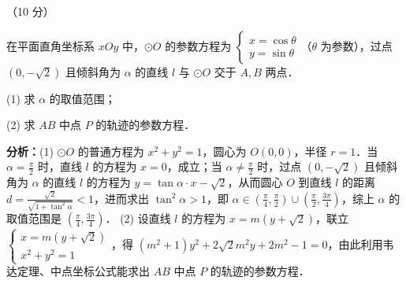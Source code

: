 \begin{question}[points=10]
[选修 4-4：坐标系与参数方程]（10 分）

在平面直角坐标系 $xOy$ 中，$\odot O$ 的参数方程为 $\begin{cases} x=\cos\theta \\ y=\sin\theta \end{cases}$（$\theta$ 为参数），过点 $(0,-\sqrt{2})$ 且倾斜角为 $\alpha$ 的直线 $l$ 与 $\odot O$ 交于 $A,B$ 两点．

(1) 求 $\alpha$ 的取值范围；

(2) 求 $AB$ 中点 $P$ 的轨迹的参数方程．
\begin{solution}

\textbf{分析：}(1) $\odot O$ 的普通方程为 $x^2+y^2=1$，圆心为 $O(0,0)$，半径 $r=1$．当 $\alpha=\frac{\pi}{2}$ 时，直线 $l$ 的方程为 $x=0$，成立；当 $\alpha\neq\frac{\pi}{2}$ 时，过点 $(0,-\sqrt{2})$ 且倾斜角为 $\alpha$ 的直线 $l$ 的方程为 $y=\tan\alpha\cdot x-\sqrt{2}$，从而圆心 $O$ 到直线 $l$ 的距离 $d=\frac{\sqrt{2}}{\sqrt{1+\tan^2\alpha}}<1$，进而求出 $\tan^2\alpha>1$，即 $\alpha\in(\frac{\pi}{4},\frac{\pi}{2})\cup(\frac{\pi}{2},\frac{3\pi}{4})$，综上 $\alpha$ 的取值范围是 $(\frac{\pi}{4},\frac{3\pi}{4})$．
(2) 设直线 $l$ 的方程为 $x=m(y+\sqrt{2})$，联立 $\begin{cases} x=m(y+\sqrt{2}) \\ x^2+y^2=1 \end{cases}$，得 $(m^2+1)y^2+2\sqrt{2}m^2y+2m^2-1=0$，由此利用韦达定理、中点坐标公式能求出 $AB$ 中点 $P$ 的轨迹的参数方程．


\end{solution}
\end{question}
